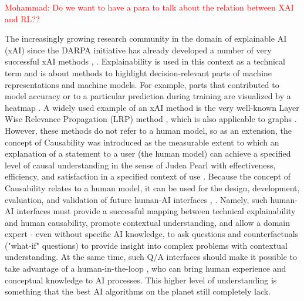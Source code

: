\documentclass[twoside,11pt]{article}
\newcommand{\MO}[1]{\textcolor{red}{Mohammad: #1}}
\begin{document}
\MO{ Do we want to have a para to talk about the relation between XAI and RL??}

The increasingly growing research community in the domain of explainable AI (xAI) since the DARPA \cite{GunningAha:2019:DARPA} initiative has already developed a number of very successful xAI methods \cite{ZhouEtAl:2021:QualitySurvey}, \cite{HolzWoj:2022:XAIOverview}. Explainability is used in this context as a technical term and is about methods to highlight decision-relevant parts of machine representations and machine models. For example, parts that contributed to model accuracy or to a particular prediction during training are visualized by a heatmap \cite{SturmEtAl:2015:InteractiveHeatmap}. A widely used example of an xAI method is the very well-known Layer Wise Relevance Propagation (LRP) method \cite{LapuschkinEtAl:2016:LRP}, which is also applicable to graphs \cite{SchnakeMontavon:2020:XAIgraphs}. However, these methods do not refer to a human model, so as an extension, the concept of Causability \cite{HolzingerEtAl:2019:Wiley-Paper} was introduced as the measurable extent to which an explanation of a statement to a user (the human model) can achieve a specified level of causal understanding in the sense of Judea Pearl \cite{Pearl:2009:Causality} with effectiveness, efficiency, and satisfaction in a specified context of use \cite{HolzingerEtAl:2020:QualityOfExplanations}. Because the concept of Causability relates to a human model, it can be used for the design, development, evaluation, and validation of future human-AI interfaces \cite{HolzingerMueller:2021:HumanAI}, \cite{HolzingerMueller:2022:PersonasAI}. Namely, such human-AI interfaces must provide a successful mapping between technical explainability and human causability, promote contextual understanding, and allow a domain expert - even without specific AI knowledge, to ask questions and counterfactuals ("what-if" questions) \cite{HolzingerEtAl:2021:MultiModalCausabilityGNN} to provide insight into complex problems with contextual understanding. At the same time, such Q/A interfaces should make it possible to take advantage of a human-in-the-loop \cite{Holzinger:2016:iML}, \cite{Holzinger:2019:HumanLoopAPIN} who can bring human experience and conceptual knowledge to AI processes. This higher level of understanding is something that the best AI algorithms on the planet still completely lack. 
\end{document}
